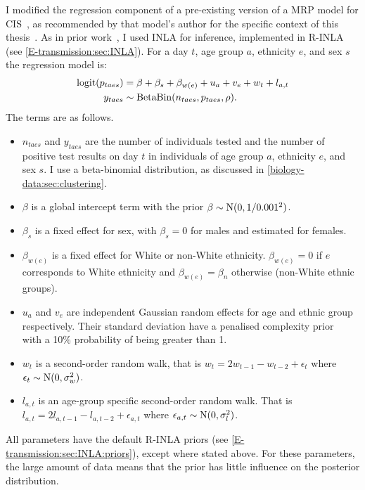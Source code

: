 \documentclass[thesis.tex]{subfiles}
\begin{document}
I modified the regression component of a pre-existing version of a MRP model for CIS~\autocite{pouwelsMRPvaccination}, as recommended by that model's author for the specific context of this thesis~.
As in prior work~\autocite{pouwelsMRPvaccination}, I used INLA for inference, implemented in R-INLA (see \cref{E-transmission:sec:INLA}).
For a day $t$, age group $a$, ethnicity $e$, and sex $s$ the regression model is:
\begin{align}
    \operatorname{logit}(p_{taes}) &= \beta + \beta_s + \beta_{w(e)} + u_a + v_e + w_t + l_{a,t} \\
    y_{taes} &\sim \operatorname{BetaBin}(n_{taes}, p_{taes}, \rho).
\end{align}
The terms are as follows.
\begin{itemize}
    \item $n_{taes}$ and $y_{taes}$ are the number of individuals tested and the number of positive test results on day $t$ in individuals of age group $a$, ethnicity $e$, and sex $s$. I use a beta-binomial distribution, as discussed in \cref{biology-data:sec:clustering}.
    \item $\beta$ is a global intercept term with the prior $\beta \sim \operatorname{N}(0, 1/0.001^2)$.
    \item $\beta_s$ is a fixed effect for sex, with $\beta_s = 0$ for males and estimated for females.
    \item $\beta_{w(e)}$ is a fixed effect for White or non-White ethnicity. $\beta_{w(e)} = 0$ if $e$ corresponds to White ethnicity and $\beta_{w(e)} = \beta_{n}$ otherwise (\ie non-White ethnic groups).%
    \item $u_a$ and $v_e$ are independent Gaussian random effects for age and ethnic group respectively. Their standard deviation have a penalised complexity prior~\autocite{simpsonPenalising} with a 10\% probability of being greater than 1.
    \item $w_t$ is a second-order random walk, that is $w_t = 2w_{t-1} - w_{t-2} + \epsilon_t$ where $\epsilon_t \sim \operatorname{N}(0, \sigma_w^2)$.
    \item $l_{a,t}$ is an age-group specific second-order random walk. That is $l_{a,t} = 2l_{a,t-1} - l_{a,t-2} + \epsilon_{a,t}$ where $\epsilon_{a,t} \sim \operatorname{N}(0, \sigma_l^2)$.
\end{itemize}
All parameters have the default R-INLA priors (see \cref{E-transmission:sec:INLA:priors}), except where stated above.
For these parameters, the large amount of data means that the prior has little influence on the posterior distribution.
\end{document}
